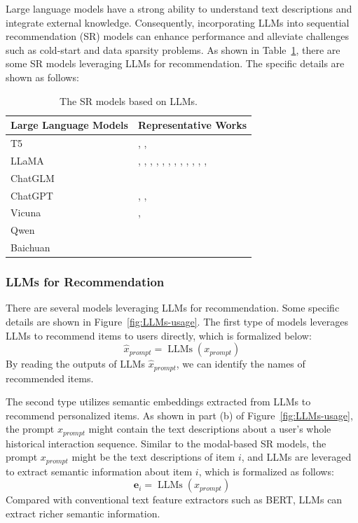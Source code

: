 \documentclass[review]{fcs}
\begin{document}
	Large language models have a strong ability to understand text descriptions and integrate external knowledge. Consequently, incorporating LLMs into sequential recommendation (SR) models can enhance performance and alleviate challenges such as cold-start and data sparsity problems. As shown in Table~\ref{tab:SR_methods_LLMs}, there are some SR models leveraging LLMs for recommendation. The specific details are shown as follows:
	\begin{table}[h]
		\caption{The SR models based on LLMs.}
		\label{tab:SR_methods_LLMs}
		\centering
		\begin{tabular}{p{5cm}l}
			\hline
			Large Language Models & Representative Works\\
			\hline
			T5  & \cite{P5}, \cite{Lite-LLM4Rec}, \cite{POD}\\
			LLaMA & \cite{SLIM}, \cite{LLM-TRSR}, \cite{RecInterpreter}, \cite{TALLRec}, \cite{DLLM2Rec}, \cite{E4SRec}, \cite{URLLM}, \cite{SeRALM}, \cite{SAID}, \cite{GenRec}, \cite{LLM4DSR}, \cite{SLMRec}, \cite{LLMEmb}\\
			ChatGLM & \cite{LSVCR}\\
			ChatGPT & \cite{LLM-ESR}, \cite{FineRec}, \cite{LRD}\\
			Vicuna & \cite{ReLLa}, \cite{RecLoRA}\\
			Qwen & \cite{BAHE}\\
			Baichuan & \cite{LLMCDSR}\\
			\hline
		\end{tabular}
	\end{table}
	\subsubsection{LLMs for Recommendation}
	There are several models leveraging LLMs for recommendation. Some specific details are shown in Figure~\ref{fig:LLMs-usage}. The first type of models leverages LLMs to recommend items to users directly, which is formalized below:
	\begin{equation}
		\hat{x}_{prompt} = \operatorname{LLMs}(x_{prompt})
	\end{equation}
	By reading the outputs of LLMs $\hat{x}_{prompt}$, we can identify the names of recommended items.
	
	The second type utilizes semantic embeddings extracted from LLMs to recommend personalized items.  As shown in part (b) of Figure~\ref{fig:LLMs-usage}, the prompt $x_{prompt}$ might contain the text descriptions about a user's whole historical interaction sequence. Similar to the modal-based SR models, the prompt $x_{prompt}$ might be the text descriptions of item $i$, and LLMs are leveraged to extract semantic information about item $i$, which is formalized as follows:
	\begin{equation}
		\mathbf{e}_{i} = \operatorname{LLMs}(x_{prompt})
	\end{equation}
	Compared with conventional text feature extractors such as BERT, LLMs can extract richer semantic information.
	
\end{document}
